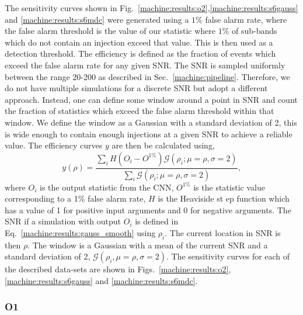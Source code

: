 %
The sensitivity curves shown in Fig.~\ref{machine:results:o2},\ref{machine:results:s6gauss} and
\ref{machine:results:s6mdc} were generated using a $1\%$ false alarm rate, where the
false alarm threshold is the value of our statistic where $1\%$ of sub-bands
which do not contain an injection exceed that value. This is then used as a
detection threshold. The efficiency is defined as the fraction of events which
exceed the false alarm rate for any given \gls{SNR}.  The \gls{SNR} is sampled
uniformly between the range 20-200 as described in Sec.~\ref{machine:pipeline}.
Therefore, we do not have multiple simulations for a discrete \gls{SNR} but adopt a different approach.
Instead, one can define some window around a point in \gls{SNR} and count the fraction of statistics which
exceed the false alarm threshold within that window.  We define the window as a
Gaussian with a standard deviation of 2, this is wide enough to contain enough
injections at a given \gls{SNR} to achieve a reliable value.
The efficiency curves $y$ are then be calculated using,
%
\begin{equation}
\label{machine:results:gauss_smooth}
y(\rho) = \frac{\sum_i H(O_i - O^{1\%}) \mathcal{G}(\rho_i;\mu=\rho,\sigma=2)}{\sum_i
\mathcal{G}(\rho_i;\mu=\rho,\sigma=2)},
\end{equation}
%
where $O_i$ is the output statistic from the \gls{CNN}, $O^{1\%}$ is the
statistic value corresponding to a 1\% false alarm rate, $H$ is the Heaviside
st ep function which has a value of 1 for positive input arguments and 0 for negative arguments. 
The \gls{SNR} if a simulation with output $O_i$ is defined in Eq.~\ref{machine:results:gauss_smooth} using $\rho_i$. The current location in \gls{SNR} is then $\rho$.
The window is a Gaussian with a mean of the current \gls{SNR} and a standard deviation of 2, $\mathcal{G}(\rho_i, \mu = \rho,\sigma=2)$. 
 The sensitivity curves for each of the described data-sets are shown in
Figs.~\ref{machine:results:o2},\ref{machine:results:s6gauss} and \ref{machine:results:s6mdc}.

\subsubsection{O1}

